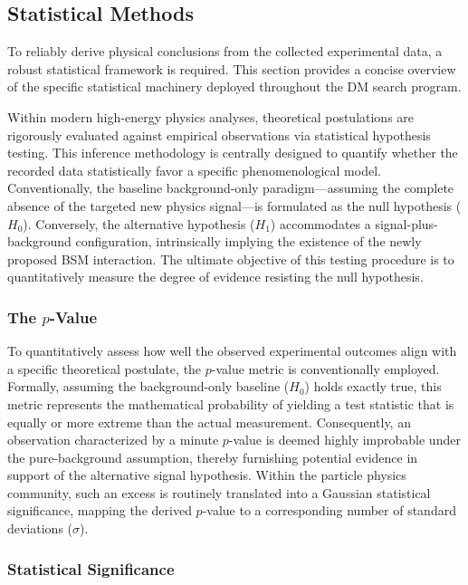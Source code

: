\subsection{Statistical Methods}
\label{sec:monoZ_stats}


To reliably derive physical conclusions from the collected experimental data, a robust statistical framework is required. This section provides a concise overview of the specific statistical machinery deployed throughout the DM search program.

Within modern high-energy physics analyses, theoretical postulations are rigorously evaluated against empirical observations via statistical hypothesis testing. This inference methodology is centrally designed to quantify whether the recorded data statistically favor a specific phenomenological model. Conventionally, the baseline background-only paradigm—assuming the complete absence of the targeted new physics signal—is formulated as the null hypothesis ($H_0$). Conversely, the alternative hypothesis ($H_1$) accommodates a signal-plus-background configuration, intrinsically implying the existence of the newly proposed BSM interaction. The ultimate objective of this testing procedure is to quantitatively measure the degree of evidence resisting the null hypothesis.

\subsubsection{The $p$-Value}
\label{sec:p-value}

To quantitatively assess how well the observed experimental outcomes align with a specific theoretical postulate, the $p$-value metric is conventionally employed. Formally, assuming the background-only baseline ($H_0$) holds exactly true, this metric represents the mathematical probability of yielding a test statistic that is equally or more extreme than the actual measurement. Consequently, an observation characterized by a minute $p$-value is deemed highly improbable under the pure-background assumption, thereby furnishing potential evidence in support of the alternative signal hypothesis. Within the particle physics community, such an excess is routinely translated into a Gaussian statistical significance, mapping the derived $p$-value to a corresponding number of standard deviations ($\sigma$).

\subsubsection{Statistical Significance}
\label{sec:significance}

